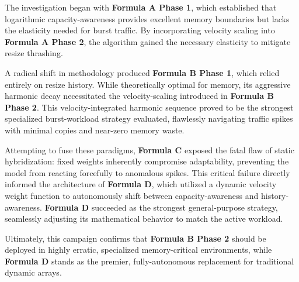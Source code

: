 \documentclass{article}
\begin{document}
The investigation began with \textbf{Formula A Phase 1}, which established that logarithmic capacity-awareness provides excellent memory boundaries but lacks the elasticity needed for burst traffic. By incorporating velocity scaling into \textbf{Formula A Phase 2}, the algorithm gained the necessary elasticity to mitigate resize thrashing.

A radical shift in methodology produced \textbf{Formula B Phase 1}, which relied entirely on resize history. While theoretically optimal for memory, its aggressive harmonic decay necessitated the velocity-scaling introduced in \textbf{Formula B Phase 2}. This velocity-integrated harmonic sequence proved to be the strongest specialized burst-workload strategy evaluated, flawlessly navigating traffic spikes with minimal copies and near-zero memory waste.

Attempting to fuse these paradigms, \textbf{Formula C} exposed the fatal flaw of static hybridization: fixed weights inherently compromise adaptability, preventing the model from reacting forcefully to anomalous spikes. This critical failure directly informed the architecture of \textbf{Formula D}, which utilized a dynamic velocity weight function to autonomously shift between capacity-awareness and history-awareness. \textbf{Formula D} succeeded as the strongest general-purpose strategy, seamlessly adjusting its mathematical behavior to match the active workload.

Ultimately, this campaign confirms that \textbf{Formula B Phase 2} should be deployed in highly erratic, specialized memory-critical environments, while \textbf{Formula D} stands as the premier, fully-autonomous replacement for traditional dynamic arrays.
\end{document}
